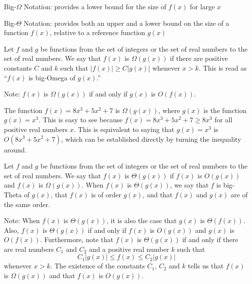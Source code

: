 \documentclass[12pt]{article}
\begin{document}
\begin{definition} Big-$\Omega$ Notation: provides a lower bound for the size of $f(x)$ for large $x$ \end{definition} 
\begin{definition} Big-$\Theta$ Notation: provides both an upper and a lower bound on the size of a function $f(x)$, relative to a reference function $g(x)$ \end{definition} 
\begin{definition} Let $f$ and $g$ be functions from the set of integers or the set of real numbers to the set of real numbers. We say that $f(x)$ is $\Omega(g(x))$ if there are positive constants $C$ and $k$ such that $|f(x)| \geq C|g(x)|$ whenever $x > k$. This is read as ``$f(x)$ is big-Omega of $g(x)$.'' \end{definition} 
Note: $f(x)$ is $\Omega(g(x))$ if and only if $g(x)$ is $O(f(x))$. 
\begin{example} The function $f(x) = 8x^3 + 5x^2 + 7$ is $\Omega(g(x))$, where $g(x)$ is the function $g(x) = x^3$. This is easy to see because $f(x) = 8x^3 + 5x^2 + 7 \geq 8x^3$ for all positive real numbers $x$. This is equivalent to saying that $g(x) = x^3$ is $O(8x^3 + 5x^2 + 7)$, which can be established directly by turning the inequality around. \end{example} 
\begin{definition} Let $f$ and $g$ be functions from the set of integers or the set of real numbers to the set of real numbers. We say that $f(x)$ is $\Theta(g(x))$ if $f(x)$ is $O(g(x))$ and $f(x)$ is $\Omega(g(x))$. When $f(x)$ is $\Theta(g(x))$, we say that $f$ is big-Theta of $g(x)$, that $f(x)$ is of order $g(x)$, and that $f(x)$ and $g(x)$ are of the same order. \end{definition} 
Note: When $f(x)$ is $\Theta(g(x))$, it is also the case that $g(x)$ is $\Theta(f(x))$. Also, $f(x)$ is $\Theta(g(x))$ if and only if $f(x)$ is $O(g(x))$ and $g(x)$ is $O(f(x))$. Furthermore, note that $f(x)$ is $\Theta(g(x))$ if and only if there are real numbers $C_1$ and $C_2$ and a positive real number $k$ such that $$C_1|g(x)| \leq f(x) \leq C_2|g(x)| $$ whenever $x > k$. The existence of the constants $C_1$, $C_2$ and $k$ tells us that $f(x)$ is $\Omega(g(x))$ and that $f(x)$ is $O(g(x))$. 
\end{document}
